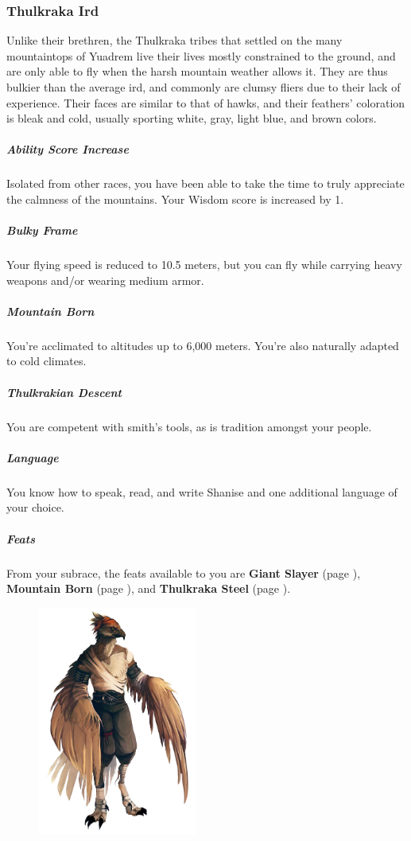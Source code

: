 \subsubsection{Thulkraka Ird}
    Unlike their brethren, the Thulkraka tribes that settled on the many mountaintops of Yuadrem live their lives mostly constrained to the ground, and are only able to fly when the harsh mountain weather allows it.
    They are thus bulkier than the average ird, and commonly are clumsy fliers due to their lack of experience.
    Their faces are similar to that of hawks, and their feathers' coloration is bleak and cold, usually sporting white, gray, light blue, and brown colors.

    \subparagraph{Ability Score Increase} Isolated from other races, you have been able to take the time to truly appreciate the calmness of the mountains.
    Your Wisdom score is increased by 1.

    \subparagraph{Bulky Frame} Your flying speed is reduced to 10.5 meters, but you can fly while carrying heavy weapons and/or wearing medium armor.

    \subparagraph{Mountain Born} You're acclimated to altitudes up to 6,000 meters.
    You're also naturally adapted to cold climates.

    \subparagraph{Thulkrakian Descent} You are competent with smith's tools, as is tradition amongst your people.

    \subparagraph{Language} You know how to speak, read, and write Shanise and one additional language of your choice.

    \subparagraph{Feats} From your subrace, the feats available to you are
    \textbf{Giant Slayer} (page \pageref{feat::giantslayer}),
    \textbf{Mountain Born} (page \pageref{feat::mountainborn}), and
    \textbf{Thulkraka Steel} (page \pageref{feat::thulkrakasteel}).

\begin{figure}[!t]
    \centering
    \includegraphics[width=0.47\textwidth]{04kins/img/12ird_thulkraka.png}
\end{figure}


